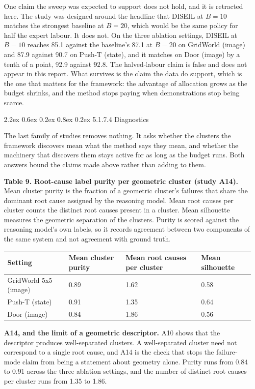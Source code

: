\documentclass[
  11pt,
]{article}
\makeatletter
\renewcommand\paragraph{\@startsection{paragraph}{4}{\z@}%
  {2.2ex \@plus 0.6ex \@minus 0.2ex}%
  {0.8ex \@plus 0.2ex}%
  {\normalfont\normalsize\bfseries}}
\makeatother
\begin{document}
One claim the sweep was expected to support does not hold, and it is
retracted here. The study was designed around the headline that DISEIL
at \(B = 10\) matches the strongest baseline at \(B = 20\), which would
be the same policy for half the expert labour. It does not. On the three
ablation settings, DISEIL at \(B = 10\) reaches 85.1 against the
baseline's 87.1 at \(B = 20\) on GridWorld (image) and 87.9 against 90.7
on Push-T (state), and it matches on Door (image) by a tenth of a point,
92.9 against 92.8. The halved-labour claim is false and does not appear
in this report. What survives is the claim the data do support, which is
the one that matters for the framework: the advantage of allocation
grows as the budget shrinks, and the method stops paying when
demonstrations stop being scarce.

\hypertarget{diagnostics}{%
\paragraph{5.1.7.4 Diagnostics}\label{diagnostics}}

The last family of studies removes nothing. It asks whether the clusters
the framework discovers mean what the method says they mean, and whether
the machinery that discovers them stays active for as long as the budget
runs. Both answers bound the claims made above rather than adding to
them.

\textbf{Table 9. Root-cause label purity per geometric cluster (study
A14).} Mean cluster purity is the fraction of a geometric cluster's
failures that share the dominant root cause assigned by the reasoning
model. Mean root causes per cluster counts the distinct root causes
present in a cluster. Mean silhouette measures the geometric separation
of the clusters. Purity is scored against the reasoning model's own
labels, so it records agreement between two components of the same
system and not agreement with ground truth.

\begin{longtable}[]{@{}llll@{}}
\toprule
Setting & Mean cluster purity & Mean root causes per cluster & Mean
silhouette\tabularnewline
\midrule
\endhead
GridWorld 5x5 (image) & 0.89 & 1.62 & 0.58\tabularnewline
Push-T (state) & 0.91 & 1.35 & 0.64\tabularnewline
Door (image) & 0.84 & 1.86 & 0.56\tabularnewline
\bottomrule
\end{longtable}

\textbf{A14, and the limit of a geometric descriptor.} A10 shows that
the descriptor produces well-separated clusters. A well-separated
cluster need not correspond to a single root cause, and A14 is the check
that stops the failure-mode claim from being a statement about geometry
alone. Purity runs from 0.84 to 0.91 across the three ablation settings,
and the number of distinct root causes per cluster runs from 1.35 to
1.86.
\end{document}

